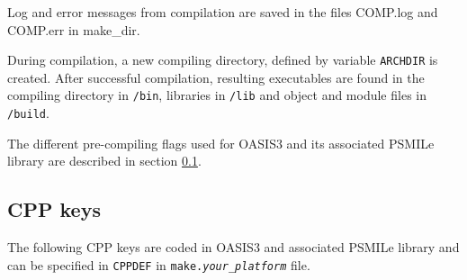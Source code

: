 Log and error messages from compilation are saved in the files
COMP.log and COMP.err in make\_dir.

During compilation, a new compiling directory, defined by variable {\tt ARCHDIR}
is created.  After successful
compilation, resulting executables are found in the compiling directory in {\tt /bin}, libraries in {\tt /lib} and object
and module files in {\tt /build}.

The different pre-compiling flags used for OASIS3 and its associated
PSMILe library are described in section \ref{subsec_CPP}.

\subsection{CPP keys}
\label{subsec_CPP}

The following CPP keys are coded in OASIS3 and associated PSMILe library and
can be specified in {\tt CPPDEF} in {\tt make.{\it your\_platform}} file.

